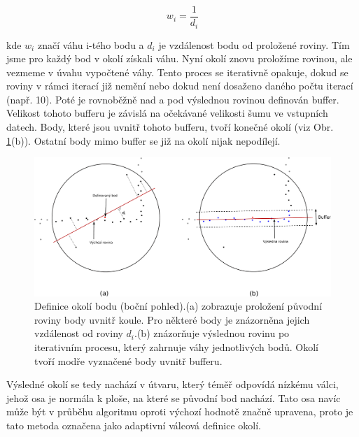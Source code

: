 \documentclass[11pt,twoside,a4paper]{book}
\begin{document}
\begin{equation}
w_i = \frac{1}{d_i}
\label{eq:vypocet-vahy}
\end{equation}

\noindent
kde $w_i$ značí váhu i-tého bodu a  $d_i$ je vzdálenost bodu od proložené roviny. Tím jsme pro každý bod v okolí získali váhu. Nyní okolí znovu proložíme rovinou, ale vezmeme v úvahu vypočtené váhy. Tento proces  se iterativně opakuje, dokud se roviny v rámci iterací již nemění nebo dokud není dosaženo daného počtu iterací (např. 10). Poté je rovnoběžně nad a pod výslednou rovinou definován buffer. Velikost tohoto bufferu je závislá na očekávané velikosti šumu ve vstupních datech. Body, které jsou uvnitř tohoto bufferu, tvoří konečné okolí (viz Obr. \ref{fig:definice-okoli}(b)). Ostatní body mimo buffer se již na okolí nijak nepodílejí.

\begin{figure}[ht]
\begin{center}
\includegraphics[width=\textwidth]{figures/definice-okoli}
\caption{Definice okolí bodu (boční pohled).\newline (a) zobrazuje proložení původní roviny body uvnitř koule. Pro některé body je znázorněna jejich vzdálenost od roviny $d_i$.\newline (b) znázorňuje výslednou rovinu po iterativním procesu, který zahrnuje váhy jednotlivých bodů. Okolí tvoří modře vyznačené body uvnitř bufferu.}
\label{fig:definice-okoli}
\end{center}
\end{figure}

Výsledné okolí se tedy nachází v útvaru, který téměř odpovídá nízkému válci, jehož osa je normála k ploše, na které se původní bod nachází. Tato osa navíc může být v průběhu algoritmu oproti výchozí hodnotě značně upravena, proto je tato metoda označena jako adaptivní válcová definice okolí. 
\end{document}

